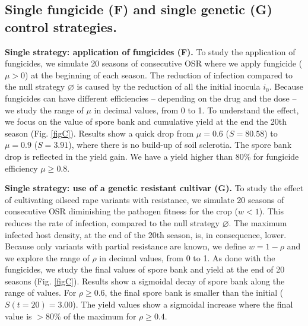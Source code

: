 \documentclass{article}
\begin{document}
  \subsection{Single fungicide (F) and single genetic (G) control strategies.} 
  
  \textbf{Single strategy: application of fungicides (F).} To study the application of fungicides, we simulate 20 seasons of consecutive OSR where we apply fungicide ($\mu > 0$) at the beginning of each season. The reduction of infection compared to the null strategy $\varnothing$ is caused by the reduction of all the initial inocula $i_0$. Because fungicides can have different efficiencies -- depending on the drug and the dose -- we study the range of $\mu$ in decimal values, from 0 to 1. To understand the effect, we focus on the value of spore bank and cumulative yield at the end the 20th season  (Fig. \ref{figC}). Results show a quick drop from $\mu = 0.6$ ($S = 80.58$) to $\mu = 0.9$ ($S = 3.91$), where there is no build-up of soil sclerotia. The spore bank drop is reflected in the yield gain. We have a yield higher than 80\% for fungicide efficiency $\mu \geq 0.8$. 
 
 \textbf{Single strategy: use of a genetic resistant cultivar (G).}  To study the effect of cultivating oilseed rape variants with resistance, we simulate 20 seasons of consecutive OSR diminishing the pathogen fitness for the crop ($w < 1$). This reduces the rate of infection, compared to the null strategy $\varnothing$. The maximum infected host density, at the end of the 20th season, is, in consequence, lower. Because only variants with partial resistance are known, we define $w = 1 - \rho$ and we explore the range of $\rho$ in decimal values, from 0 to 1. As done with the fungicides, we study the final values of spore bank and yield at the end of 20 seasons  (Fig. \ref{figC}). Results show a sigmoidal decay of spore bank along the range of values. For $\rho \geq 0.6$, the final spore bank is smaller than the initial ($S(t=20) = 3.00$). The yield values show a sigmoidal increase where the final value is $>80\%$ of the maximum for $\rho \geq 0.4$.
 
\end{document}
